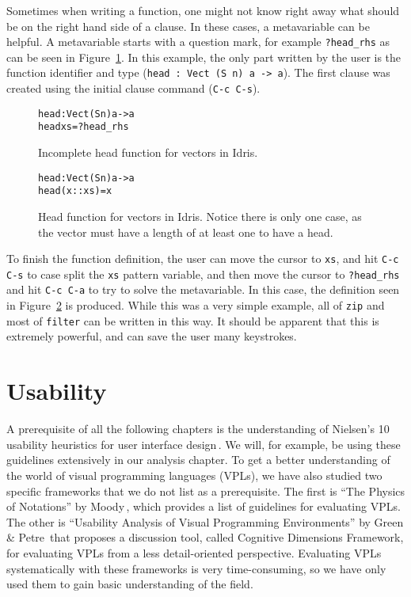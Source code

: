 Sometimes when writing a function, one might not know right away what should be on the right hand side of a clause.
In these cases, a metavariable can be helpful. A metavariable starts with a question mark, for example \texttt{?head\_rhs} as can be seen in Figure~\ref{fig:incomplete_head}.
In this example, the only part written by the user is the function identifier and type (\texttt{head : Vect (S n) a -> a}).
The first clause was created using the initial clause command (\texttt{C-c C-s}).

\begin{figure}
\begin{alltt}
head : Vect (S n) a -> a
head xs = ?head_rhs
\end{alltt}
\caption{Incomplete head function for vectors in Idris.}
\label{fig:incomplete_head}
\end{figure}

\begin{figure}
\begin{alltt}
head : Vect (S n) a -> a
head (x :: xs) = x
\end{alltt}
\caption{Head function for vectors in Idris. Notice there is only one case, as the vector must have a length of at least one to have a head.}
\label{fig:head}
\end{figure}

To finish the function definition, the user can move the cursor to \texttt{xs}, and hit \texttt{C-c C-s} to case split the \texttt{xs} pattern variable, and then move the cursor to \texttt{?head\_rhs} and hit \texttt{C-c C-a} to try to solve the metavariable.
In this case, the definition seen in Figure~\ref{fig:head} is produced.
While this was a very simple example, all of \texttt{zip} and most of \texttt{filter} can be written in this way.
It should be apparent that this is extremely powerful, and can save the user many keystrokes.

\section{Usability}
A prerequisite of all the following chapters is the understanding of Nielsen's
10 usability heuristics for user interface design\,\cite{nielsen1990heuristic}.
We will, for example, be using these guidelines extensively in our analysis chapter.
To get a better understanding of the world of visual programming languages (VPLs), we
have also studied two specific frameworks that we do not list as a
prerequisite. The first is ``The Physics of Notations'' by Moody\,\cite{Moody:2009:NTS:1687047.1687149},
which provides a list of guidelines for evaluating VPLs. The other is ``Usability Analysis of Visual Programming Environments''
by Green & Petre\,\cite{Green96usabilityanalysis} that proposes a discussion
tool, called Cognitive Dimensions Framework, for evaluating VPLs from a less
detail-oriented perspective. Evaluating VPLs systematically with these frameworks is very time-consuming, so we have
only used them to gain basic understanding of the field.





